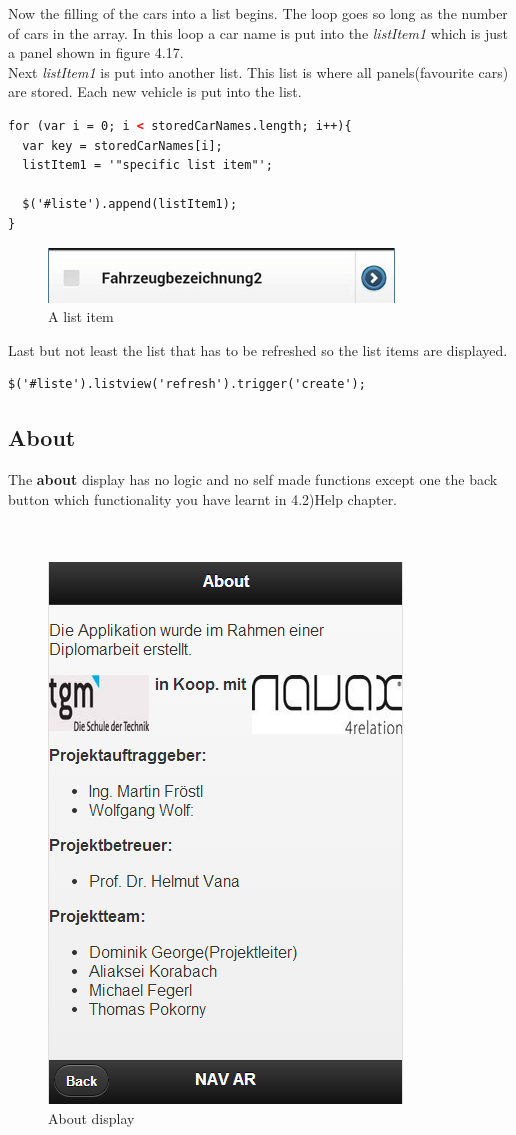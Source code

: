 Now the filling of the cars into a list begins. The loop goes so long as the number of cars in the array. In this loop a car name is put into the \textit{listItem1} which is just a panel shown in figure 4.17.
\\

Next \textit{listItem1} is put into another list. This list is where all panels(favourite cars) are stored. Each new vehicle is put into the list.
\\
\begin{lstlisting}[language=html, caption= 
Adding list items into the list,captionpos=b]
for (var i = 0; i < storedCarNames.length; i++){
  var key = storedCarNames[i];
  listItem1 = '"specific list item"';

  $('#liste').append(listItem1);
}
\end{lstlisting}

\begin{figure}[h]
\centering
\includegraphics[width=0.7\linewidth]{graphics/chapter4/16}
\caption{A list item}
\end{figure}

Last but not least the list that has to be refreshed so the list items are displayed. 
\\

\begin{lstlisting}[language=html, caption= 
Refreshing the list,captionpos=b]
$('#liste').listview('refresh').trigger('create'); 
\end{lstlisting}


\subsection{About}
The \textbf{about} display has no logic and no self made functions except one the back button which functionality you have learnt in 4.2)Help chapter.
\\\\\\
\begin{figure}[h]
\centering
\includegraphics[width=0.4\linewidth]{graphics/chapter4/17}
\caption{About display}
\end{figure}
\newpage


